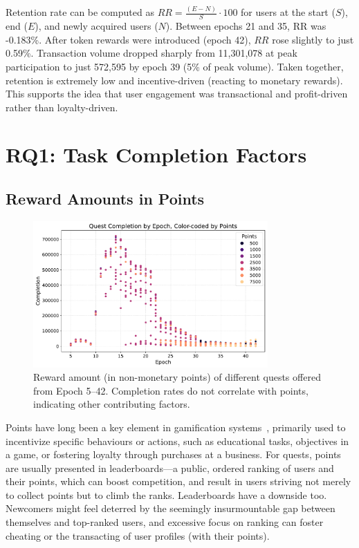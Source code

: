 Retention rate can be computed as $RR= \frac{(E-N)}{S}\cdot 100$ for users at the start ($S$), end ($E$), and newly acquired users ($N$). Between epochs 21 and 35, RR was -0.183\%. After token rewards were introduced (epoch 42), $RR$ rose slightly to just 0.59\%. Transaction volume dropped sharply from 11,301,078 at peak participation to just 572,595 by epoch 39 (5\% of peak volume). Taken together, retention is extremely low and incentive-driven (reacting to monetary rewards). This supports the idea that user engagement was transactional and profit-driven rather than loyalty-driven.


\section{RQ1: Task Completion Factors}
\subsection{Reward Amounts in Points}

\begin{figure}[t]
    \centering
    \includegraphics[width=0.8\textwidth]{figures/points.pdf}
    \caption{Reward amount (in non-monetary points) of different quests offered from Epoch 5--42. Completion rates do not correlate with points, indicating other contributing factors.\label{fig:points}}
\end{figure}

Points have long been a key element in gamification systems~\cite{HKS14}, primarily used to incentivize specific behaviours or actions, such as educational tasks, objectives in a game, or fostering loyalty through purchases at a business. For quests, points are usually presented in leaderboards---a public, ordered ranking of users and their points, which can boost competition, and result in users striving not merely to collect points but to climb the ranks. Leaderboards have a downside too. Newcomers might feel deterred by the seemingly insurmountable gap between themselves and top-ranked users, and excessive focus on ranking can foster cheating or the transacting of user profiles (with their points).

